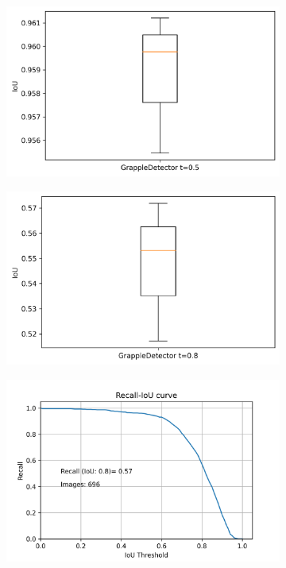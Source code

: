  	 
 	\begin{figure}[h]
 		\centering
 		\begin{subfigure}[c]{0.32\textwidth}			
 			\includegraphics[width=1\textwidth]{bilder/FazitUndAusblick/Grapple_TTAE_Res/IoU_TTAE_05.png}
 		\end{subfigure}
 		\begin{subfigure}[c]{0.32\textwidth}			
 			\includegraphics[width=1\textwidth]{bilder/FazitUndAusblick/Grapple_TTAE_Res/IoU_TTAE_08.png}
 		\end{subfigure}
 		\begin{subfigure}[c]{0.32\textwidth}			
 			\includegraphics[width=1\textwidth]{bilder/FazitUndAusblick/Grapple_TTAE_Res/Recall_IoU_TTAE.png}

\end{subfigure}
\end{figure}
